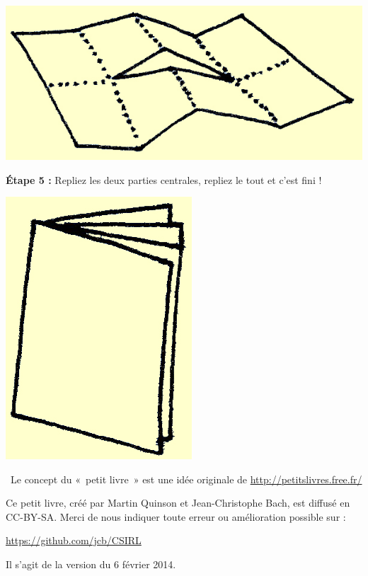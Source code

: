 \documentclass[a4paper,12pt]{article}
\begin{document}
\begin{minipage}[b]{.45\linewidth}
\bigskip
\bigskip \centerline{\includegraphics{img/ptitlivre-etape3.jpg}}
  
\bigskip
\bigskip
\bigskip
\bigskip
\noindent\textbf{Étape 5 :} Repliez les deux parties centrales, repliez
le tout et c'est fini !

  \centerline{\includegraphics{img/ptitlivre-etape5.jpg}}

\bigskip
\end{minipage}

\bigskip~\hfill{\small Le concept du «~petit livre~» est une idée
  originale de {\color{blue}\url{http://petitslivres.free.fr/}}}

\bigskip \bigskip \bigskip %
Ce petit livre, créé par Martin Quinson et Jean-Christophe Bach, est
diffusé en CC-BY-SA. Merci de nous indiquer toute erreur ou
amélioration possible sur :

\centerline{\color{blue}\url{https://github.com/jcb/CSIRL}}

\bigskip%
Il s'agit de la version du 6 février 2014.
\end{document}

